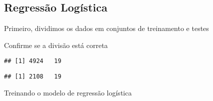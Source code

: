 \documentclass[]{article}
\begin{document}
\hypertarget{regressuxe3o-loguxedstica}{%
\subsection{Regressão Logística}\label{regressuxe3o-loguxedstica}}

Primeiro, dividimos os dados em conjuntos de treinamento e testes

Confirme se a divisão está correta

\begin{verbatim}
## [1] 4924   19
\end{verbatim}

\begin{verbatim}
## [1] 2108   19
\end{verbatim}

Treinando o modelo de regressão logística
\end{document}
